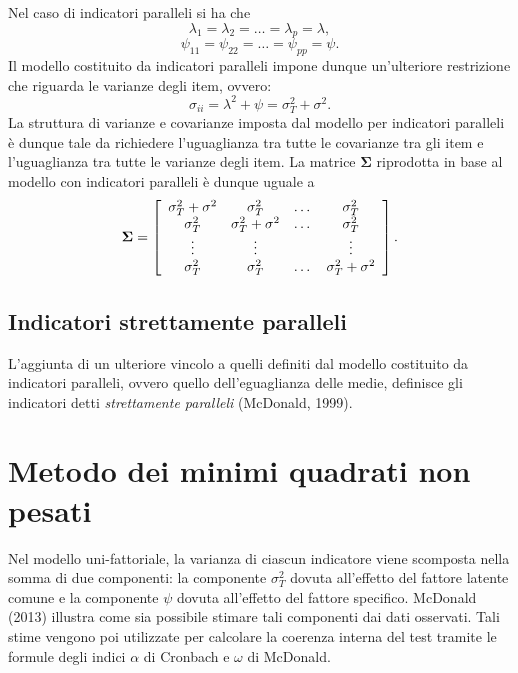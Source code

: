  Nel caso di indicatori paralleli si ha che
  $$\lambda_1=\lambda_2=\dots=\lambda_p=\lambda,$$
  $$\psi_{11}=\psi_{22}=\dots=\psi_{pp}=\psi.$$ 
 Il modello costituito da indicatori paralleli impone dunque un'ulteriore restrizione che riguarda le varianze degli item, ovvero:
\begin{equation}
\sigma_{ii} = \lambda^2 + \psi =\sigma^2_T + \sigma^2.
\end{equation} 
La struttura di varianze e covarianze imposta dal modello per
indicatori paralleli è dunque tale da richiedere l'uguaglianza tra
tutte le covarianze tra gli item e l'uguaglianza tra tutte le varianze
degli item. La matrice  $\boldsymbol{\Sigma}$ riprodotta in base al modello con indicatori paralleli è dunque uguale a
  \begin{equation}
    \boldsymbol{\Sigma}=\left[
      \begin{array}{ c c c c }
        \sigma_{T}^2 + \sigma^2 & \sigma_{T}^2 & \dots & \sigma_{T}^2 \\
        \sigma_{T}^2 & \sigma_{T}^2 + \sigma^2 & \dots & \sigma_{T}^2 \\
        \vdots & \vdots & & \vdots\\
        \sigma_{T}^2 & \sigma_{T}^2 & \dots & \sigma_{T}^2 +\sigma^2 \notag
      \end{array} 
    \right].
  \end{equation}

\subsection{Indicatori strettamente paralleli}

 L'aggiunta di un ulteriore vincolo a quelli definiti dal modello costituito da indicatori paralleli, ovvero quello
  dell'eguaglianza delle medie, definisce gli indicatori detti
  \textit{strettamente paralleli} (McDonald, 1999).
  

\section{Metodo dei  minimi quadrati non pesati}

Nel modello uni-fattoriale, la varianza di ciascun 
  indicatore viene scomposta nella somma di due componenti: 
la componente  $\sigma^2_T$ dovuta all'effetto del fattore latente comune e
 la   componente $\psi$ dovuta all'effetto del fattore specifico.
  McDonald (2013)  illustra come sia possibile
   stimare tali componenti  dai dati osservati.
  Tali stime vengono poi utilizzate per calcolare la coerenza interna del test tramite le formule degli indici $\alpha$ di Cronbach e $\omega$ di McDonald. 

